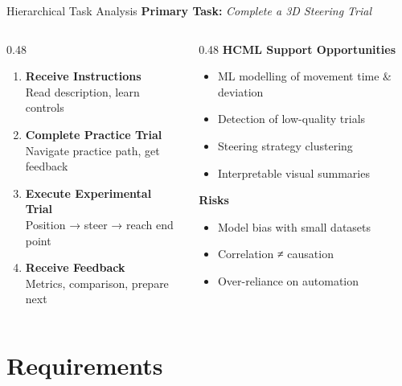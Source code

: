 \documentclass[aspectratio=169, 10pt]{beamer}
\begin{document}
\begin{frame}{Hierarchical Task Analysis}
  \textbf{Primary Task:} \emph{Complete a 3D Steering Trial}

  \begin{columns}[T]
    \begin{column}{0.48\textwidth}
      \begin{enumerate}
        \item \textbf{Receive Instructions}\\
              Read description, learn controls
        \item \textbf{Complete Practice Trial}\\
              Navigate practice path, get feedback
        \item \textbf{Execute Experimental Trial}\\
              Position → steer → reach end point
        \item \textbf{Receive Feedback}\\
              Metrics, comparison, prepare next
      \end{enumerate}
    \end{column}
    \begin{column}{0.48\textwidth}
      \textbf{HCML Support Opportunities}
      \begin{itemize}
        \item ML modelling of movement time \& deviation
        \item Detection of low-quality trials
        \item Steering strategy clustering
        \item Interpretable visual summaries
      \end{itemize}
      \vspace{0.5em}
      \textbf{Risks}
      \begin{itemize}
        \item Model bias with small datasets
        \item Correlation ≠ causation
        \item Over-reliance on automation
      \end{itemize}
    \end{column}
  \end{columns}
\end{frame}

\section{Requirements}
\end{document}
